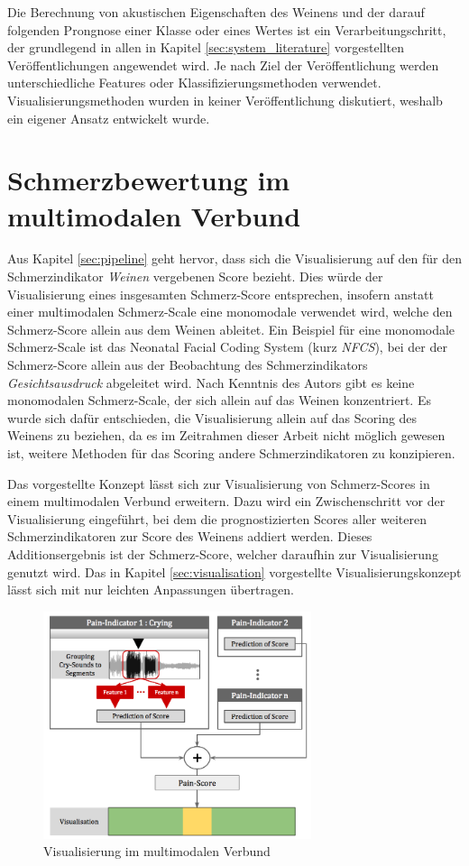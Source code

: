 Die Berechnung von akustischen Eigenschaften des Weinens und der darauf folgenden Prongnose einer Klasse oder eines Wertes ist ein Verarbeitungschritt, der grundlegend in allen in Kapitel \ref{sec:system_literature} vorgestellten Veröffentlichungen angewendet wird. Je nach Ziel der Veröffentlichung werden unterschiedliche Features oder Klassifizierungsmethoden verwendet. Visualisierungsmethoden wurden in keiner Veröffentlichung diskutiert, weshalb ein eigener Ansatz entwickelt wurde.

\section{Schmerzbewertung im multimodalen Verbund}
\label{sec:multimodal_integration}

Aus Kapitel \ref{sec:pipeline} geht hervor, dass sich die Visualisierung auf den für den Schmerzindikator \emph{Weinen} vergebenen Score bezieht. Dies würde der Visualisierung eines insgesamten Schmerz-Score entsprechen, insofern anstatt einer multimodalen Schmerz-Scale eine monomodale verwendet wird, welche den Schmerz-Score allein aus dem Weinen ableitet. Ein Beispiel für eine monomodale Schmerz-Scale ist das \glqq Neonatal Facial Coding System\grqq{} (kurz \emph{NFCS}), bei der der Schmerz-Score allein aus der Beobachtung des Schmerzindikators \emph{Gesichtsausdruck} abgeleitet wird.\cite[S. 70]{PainAssessment02} Nach Kenntnis des Autors gibt es keine monomodalen Schmerz-Scale, der sich allein auf das Weinen konzentriert. Es wurde sich dafür entschieden, die Visualisierung allein auf das Scoring des Weinens zu beziehen, da es im Zeitrahmen dieser Arbeit nicht möglich gewesen ist, weitere Methoden für das Scoring andere Schmerzindikatoren zu konzipieren.

Das vorgestellte Konzept lässt sich zur Visualisierung von Schmerz-Scores in einem multimodalen Verbund erweitern. Dazu wird ein Zwischenschritt vor der Visualisierung eingeführt, bei dem die prognostizierten Scores aller weiteren Schmerzindikatoren zur Score des Weinens addiert werden. Dieses Additionsergebnis ist der Schmerz-Score, welcher daraufhin zur Visualisierung genutzt wird. Das in Kapitel  \ref{sec:visualisation} vorgestellte Visualisierungskonzept lässt sich mit nur leichten Anpassungen übertragen.

\begin{figure}[h]
	\centering
	\includegraphics[width=0.7\textwidth]{bilder/multimodal_viz_02.png}
	\caption{Visualisierung im multimodalen Verbund}
	\label{img:multimodal-overview}
\end{figure}